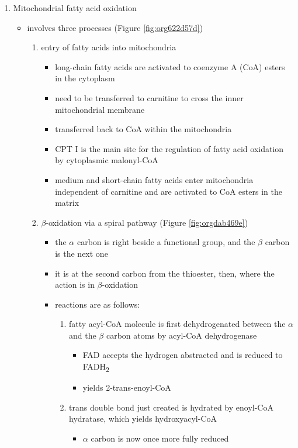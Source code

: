 \documentclass{scrartcl}
\begin{document}
\begin{enumerate}
\item Mitochondrial fatty acid oxidation
\label{sec:orgcfdc204}

\begin{itemize}
\item involves three processes (Figure \ref{fig:org622d57d})
\begin{enumerate}
\item entry of fatty acids into mitochondria
\begin{itemize}
\item long-chain fatty acids are activated to coenzyme A (CoA) esters
in the cytoplasm
\item need to be transferred to carnitine to cross the inner
mitochondrial membrane
\item transferred back to CoA within the mitochondria
\item CPT I is the main site for the regulation of fatty acid
oxidation by cytoplasmic malonyl-CoA
\item medium and short-chain fatty acids enter mitochondria
independent of carnitine and are activated to CoA esters in the
matrix
\end{itemize}
\item \(\beta\)-oxidation via a spiral pathway (Figure \ref{fig:orgdab469e})
\begin{itemize}
\item the \(\alpha\) carbon is right beside a functional group, and the
\(\beta\) carbon is the next one
\item it is at the second carbon from the thioester, then, where the
action is in \(\beta\)-oxidation
\item reactions are as follows:
\begin{enumerate}
\item fatty acyl-CoA molecule is first dehydrogenated between the \(\alpha\)
and the \(\beta\) carbon atoms by acyl-CoA dehydrogenase
\begin{itemize}
\item FAD accepts the hydrogen abstracted and is reduced to FADH\textsubscript{2}
\item yields 2-trans-enoyl-CoA
\end{itemize}
\item trans double bond just created is hydrated by enoyl-CoA
hydratase, which yields hydroxyacyl-CoA
\begin{itemize}
\item \(\alpha\) carbon is now once more fully reduced

\end{itemize}
\end{enumerate}
\end{itemize}
\end{enumerate}
\end{itemize}
\end{enumerate}
\end{document}
